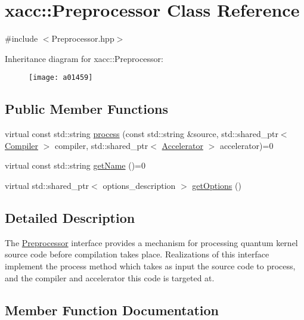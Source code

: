 \hypertarget{a01459}{}\section{xacc\+:\+:Preprocessor Class Reference}
\label{a01459}


{\ttfamily \#include $<$Preprocessor.\+hpp$>$}

Inheritance diagram for xacc\+:\+:Preprocessor\+:\begin{figure}[H]
\begin{center}
\leavevmode
\texttt{[image: a01459]}
\end{center}
\end{figure}
\subsection*{Public Member Functions}
\begin{DoxyCompactItemize}
\item 
virtual const std\+::string \hyperlink{a01459_ae59b5a2963f8bcc84b590a83f4749e19}{process} (const std\+::string \&source, std\+::shared\+\_\+ptr$<$ \hyperlink{a01451}{Compiler} $>$ compiler, std\+::shared\+\_\+ptr$<$ \hyperlink{a01435}{Accelerator} $>$ accelerator)=0
\item 
virtual const std\+::string \hyperlink{a01459_a36671f4c062d61e230306edc404774cd}{get\+Name} ()=0
\item 
virtual std\+::shared\+\_\+ptr$<$ options\+\_\+description $>$ \hyperlink{a01459_a96f5600ea47628b66917c7b90250e7f1}{get\+Options} ()
\end{DoxyCompactItemize}


\subsection{Detailed Description}
The \hyperlink{a01459}{Preprocessor} interface provides a mechanism for processing quantum kernel source code before compilation takes place. Realizations of this interface implement the process method which takes as input the source code to process, and the compiler and accelerator this code is targeted at. 

\subsection{Member Function Documentation}
\mbox{\label{a01459_a36671f4c062d61e230306edc404774cd}} 
